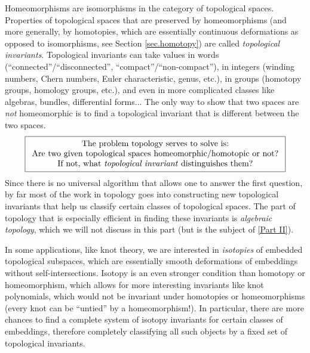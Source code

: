 \documentclass[english,letterpaper]{article}%
\numberwithin{equation}{section}
\numberwithin{figure}{section}
\numberwithin{table}{section}
\theoremstyle{definition}
\theoremstyle{definition}
\theoremstyle{definition}
\theoremstyle{plain}
\theoremstyle{plain}
\theoremstyle{plain}
\theoremstyle{plain}
\theoremstyle{remark}
\theoremstyle{remark}
\renewenvironment{gather*}{\gather}{\endgather}
\newcommand{\PRLsep}{   %
           \noindent\makebox[\linewidth]{
                \resizebox{0.5\linewidth}{1pt}{$\blacklozenge$}}}
\begin{document}
Homeomorphisms are isomorphisms in the category of topological spaces. Properties of topological spaces that are preserved by homeomorphisms (and more generally, by homotopies, which are essentially continuous deformations as opposed to isomorphisms, see Section \ref{sec.homotopy}) are called \emph{topological invariants}. Topological invariants can take values in words (``connected''/``disconnected'', ``compact''/``non-compact''), in integers (winding numbers, Chern numbers, Euler characteristic, genus, etc.), in groups (homotopy groups, homology groups, etc.), and even in more complicated classes like algebras, bundles, differential forms... The only way to show that two spaces are \emph{not} homeomorphic is to find a topological invariant that is different between the two spaces.
\begin{gather*}
\boxed{\begin{array}{c}
\text{The problem topology serves to solve is:}\\
\text{Are two given topological spaces homeomorphic/homotopic or not?}\\
\text{If not, what \emph{topological invariant} distinguishes them?}
\end{array}}
\end{gather*}
Since there is no universal algorithm that allows one to answer the first question, by far most of the work in topology goes into constructing new topological invariants that help us classify certain classes of topological spaces. The part of topology that is especially efficient in finding these invariants is \emph{algebraic topology}, which we will not discuss in this part (but is the subject of \ref{Part II}).

\begin{rem}
In some applications, like knot theory, we are interested in \emph{isotopies} of embedded topological subspaces, which are essentially smooth deformations of embeddings without self-intersections. Isotopy is an even stronger condition than homotopy or homeomorphism, which allows for more interesting invariants like knot polynomials, which would not be invariant under homotopies or homeomorphisms (every knot can be ``untied'' by a homeomorphism!). In particular, there are more chances to find a complete system of isotopy invariants for certain classes of embeddings, therefore completely classifying all such objects by a fixed set of topological invariants.
\end{rem}

\PRLsep
\end{document}
